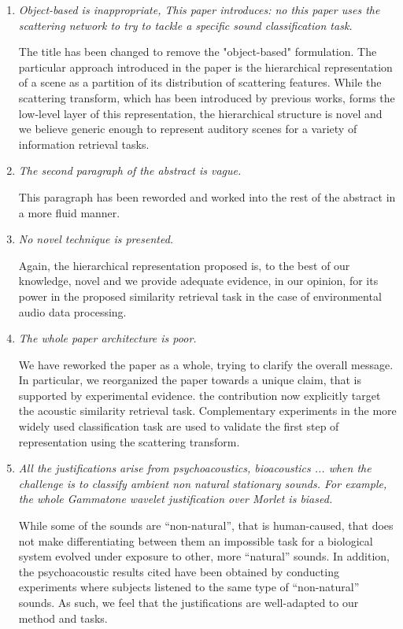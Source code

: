 \documentclass[10pt]{article}
\begin{document}
\begin{enumerate}

\item \emph{Object-based is inappropriate, This paper introduces: no this paper uses the scattering network to try to tackle a specific sound classification task.}

The title has been changed to remove the "object-based" formulation. The particular approach introduced in the paper is the hierarchical representation of a scene as a partition of its distribution of scattering features. While the scattering transform, which has been introduced by previous works, forms the low-level layer of this representation, the hierarchical structure is novel and we believe generic enough to represent auditory scenes for a variety of information retrieval tasks.

\item \emph{The second paragraph of the abstract is vague.}

This paragraph has been reworded and worked into the rest of the abstract in a more fluid manner.

\item \emph{No novel technique is presented.}

Again, the hierarchical representation proposed is, to the best of our knowledge, novel and we provide adequate evidence, in our opinion, for its power in the proposed similarity retrieval task in the case of environmental audio data processing.

\item \emph{The whole paper architecture is poor.}

We have reworked the paper as a whole, trying to clarify the overall message. In particular, we reorganized the paper towards a unique claim, that is supported by experimental evidence. the contribution now explicitly target the acoustic similarity retrieval task. Complementary experiments in the more widely used classification task are used to validate the first step of representation using the scattering transform.


\item \emph{All the justifications arise from psychoacoustics, bioacoustics ... when the challenge is to classify ambient non natural stationary sounds. For example, the whole Gammatone wavelet justification over Morlet is biased.}

While some of the sounds are ``non-natural'', that is human-caused, that does not make differentiating between them an impossible task for a biological system evolved under exposure to other, more ``natural'' sounds. In addition, the psychoacoustic results cited have been obtained by conducting experiments where subjects listened to the same type of ``non-natural'' sounds. As such, we feel that the justifications are well-adapted to our method and tasks.


\end{enumerate}
\end{document}
